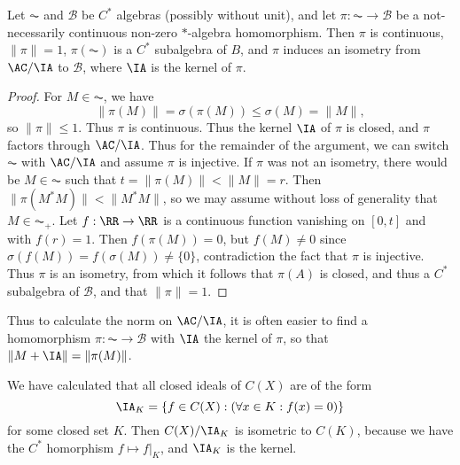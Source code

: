 \begin{lemma}
    Let $\AC$ and $\mathcal{B}$ be $C^*$ algebras (possibly without unit), and let $\pi: \AC \to \mathcal{B}$ be a not-necessarily continuous non-zero $*$-algebra homomorphism. Then $\pi$ is continuous, $\| \pi \| = 1$, $\pi(\AC)$ is a $C^*$ subalgebra of $B$, and $\pi$ induces an isometry from $\AC/\IA$ to $\mathcal{B}$, where $\IA$ is the kernel of $\pi$.
\end{lemma}
\begin{proof}
    For $M \in \AC$, we have
    \[ \| \pi(M) \| = \sigma(\pi(M)) \leq \sigma(M) = \| M \|, \]
    so $\| \pi \| \leq 1$. Thus $\pi$ is continuous. Thus the kernel $\IA$ of $\pi$ is closed, and $\pi$ factors through $\AC/\IA$. Thus for the remainder of the argument, we can switch $\AC$ with $\AC / \IA$ and assume $\pi$ is injective. If $\pi$ was not an isometry, there would be $M \in \AC$ such that $t = \| \pi(M) \| < \| M \| = r$. Then $\| \pi(M^*M) \| < \| M^*M \|$, so we may assume without loss of generality that $M \in \AC_+$. Let $f: \RR \to \RR$ is a continuous function vanishing on $[0, t]$ and with $f(r) = 1$. Then $f(\pi(M)) = 0$, but $f(M) \neq 0$ since $\sigma(f(M)) = f(\sigma(M)) \neq \{ 0 \}$, contradiction the fact that $\pi$ is injective. Thus $\pi$ is an isometry, from which it follows that $\pi(A)$ is closed, and thus a $C^*$ subalgebra of $\mathcal{B}$, and that $\| \pi \| = 1$.
\end{proof}

Thus to calculate the norm on $\AC/\IA$, it is often easier to find a homomorphism $\pi: \AC \to \mathcal{B}$ with $\IA$ the kernel of $\pi$, so that $\| M + \IA \| = \| \pi(M) \|$.

\begin{example}
    We have calculated that all closed ideals of $C(X)$ are of the form
    \[ \IA_K = \{ f \in C(X) : (\forall x \in K: f(x) = 0) \} \]
    for some closed set $K$. Then $C(X)/\IA_K$ is isometric to $C(K)$, because we have the $C^*$ homorphism $f \mapsto f|_K$, and $\IA_K$ is the kernel.
\end{example}


